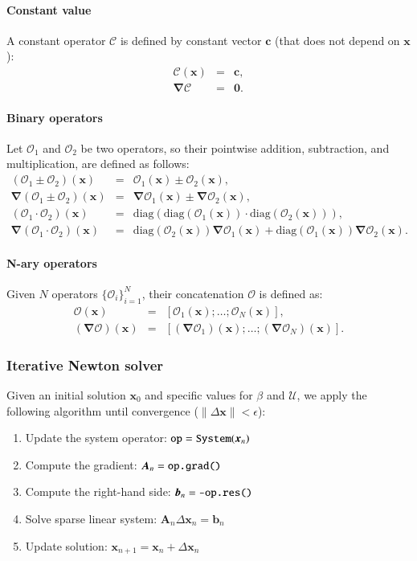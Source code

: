 \documentclass[final]{elsarticle}
\newcommand{\diag}{\ensuremath{\mathrm{diag}}}
\newcommand\eps \epsilon
\newcommand\bnabla{\boldsymbol{\nabla}}
\newcommand\bx{\boldsymbol{x}}
\newcommand\bc{\boldsymbol{c}}
\newcommand\bzero{\boldsymbol{0}}
\newcommand\cO{\mathcal{O}}
\newcommand\cU{\mathscr{U}}
\begin{document}
\paragraph{Constant value}
A constant operator $\mathcal{C}$ is defined by constant vector $\bc$ 
(that does not depend on $\bx$):
\begin{eqnarray*}
\mathcal{C}(\bx) &=& \bc, \\
\bnabla\mathcal{C} &=& \bzero.
\end{eqnarray*}

\paragraph{Binary operators}
Let $\cO_1$ and $\cO_2$ be two operators, so their pointwise addition, subtraction,
and multiplication, are defined as follows:
\begin{eqnarray*}
(\cO_1 \pm \cO_2)(\bx) &=& \cO_1(\bx) \pm \cO_2(\bx), \\
\bnabla (\cO_1 \pm \cO_2)(\bx)   &=& \bnabla\cO_1(\bx) \pm \bnabla\cO_2(\bx), \\
(\cO_1 \cdot \cO_2)(\bx) &=& \diag(\diag(\cO_1(\bx)) \cdot \diag(\cO_2(\bx))), \\
\bnabla (\cO_1 \cdot \cO_2)(\bx) &=& \diag(\cO_2(\bx)) \bnabla\cO_1(\bx) 
                                  + \diag(\cO_1(\bx)) \bnabla\cO_2(\bx).
\end{eqnarray*}

\paragraph{N-ary operators}
Given $N$ operators $\{\cO_i\}_{i=1}^N$, their concatenation $\cO$ is defined as:
\begin{eqnarray*}
\cO(\bx) &=& [\cO_1(\bx); \ldots; \cO_N(\bx)], \\
(\bnabla\cO)(\bx) &=& [(\bnabla\cO_1)(\bx); \ldots; (\bnabla\cO_N)(\bx)].
\end{eqnarray*}

\subsubsection{Iterative Newton solver}
Given an initial solution $\bx_0$ and specific values for $\beta$ and $\cU$, 
we apply the following algorithm 
until convergence ($\|\Delta \bx\| < \eps$):
\begin{enumerate}
\item Update the system operator: $\verb|op| = \verb|System|(\bx_{n})$
\item Compute the gradient: $\boldsymbol{A}_n = \verb|op.grad()|$
\item Compute the right-hand side: $\boldsymbol{b}_n = \verb|-op.res()|$
\item Solve sparse linear system: $\boldsymbol{A}_n \Delta \bx_n = \boldsymbol{b}_n$
\item Update solution: $\bx_{n+1} = \bx_{n} + \Delta \bx_{n}$
\end{enumerate}
\end{document}
